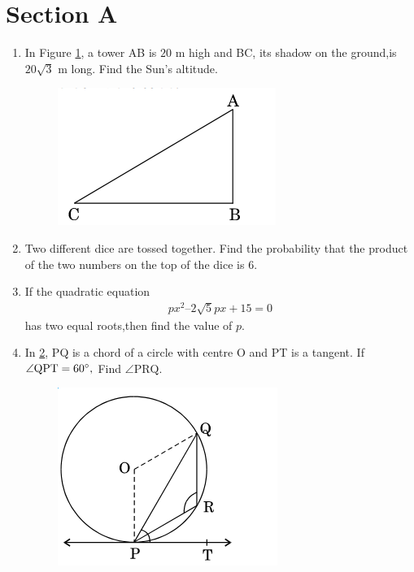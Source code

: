 \documentclass[journal,12pt,twocolumn]{IEEEtran}
\renewcommand\thesection{\arabic{section}}
\begin{document}
\section{Section A}
\renewcommand{\theequation}{\theenumi}
\begin{enumerate}[label=\thesection.\arabic*.,ref=\thesection.\theenumi]
\item In Figure \ref{Figure 1}, a tower AB is $20$ m high and BC, its shadow on the ground,is $20\sqrt{3}$ m long. Find the Sun’s altitude.
\begin{figure}[h!]
	\centering
    \includegraphics[width=0.8\columnwidth,center]{./figs/image1.png}
	\caption{}
	\label{Figure 1}
\end{figure}
\item Two different dice are tossed together. Find the probability that the product of the two numbers on the top of the dice is $6$.
\item If the quadratic equation
\begin{align*} 
px^2 – 2 \sqrt{5} px + 15 = 0
\end{align*}
has two equal roots,then find the value of $p$.
\item In \ref{Figure 2}, PQ is a chord of a circle with centre O and PT is a tangent. If $\angle \text{QPT} = 60 \degree,$ Find $\angle \text{PRQ} $.
\begin{figure}[h!]
	\centering
    \includegraphics[width=0.8\columnwidth,center]{./figs/image2.png}
	\caption{}
	\label{Figure 2}
\end{figure}
\end{enumerate}
\end{document}
